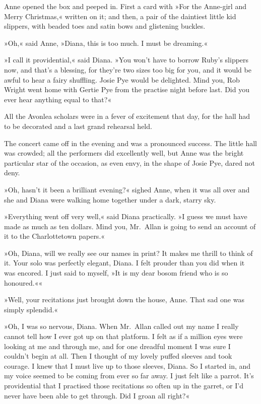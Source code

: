 Anne opened the box and peeped in. First a card with »For the Anne-girl and Merry Christmas,« written on it; and then, a pair of the daintiest little kid slippers, with beaded toes and satin bows and glistening buckles.

»Oh,« said Anne, »Diana, this is too much. I must be dreaming.«

»I call it providential,« said Diana. »You won't have to borrow Ruby's slippers now, and that's a blessing, for they're two sizes too big for you, and it would be awful to hear a fairy shuffling. Josie Pye would be delighted. Mind you, Rob Wright went home with Gertie Pye from the practise night before last. Did you ever hear anything equal to that?«

All the Avonlea scholars were in a fever of excitement that day, for the hall had to be decorated and a last grand rehearsal held.

The concert came off in the evening and was a pronounced success. The little hall was crowded; all the performers did excellently well, but Anne was the bright particular star of the occasion, as even envy, in the shape of Josie Pye, dared not deny.

»Oh, hasn't it been a brilliant evening?« sighed Anne, when it was all over and she and Diana were walking home together under a dark, starry sky.

»Everything went off very well,« said Diana practically. »I guess we must have made as much as ten dollars. Mind you, Mr.~Allan is going to send an account of it to the Charlottetown papers.«

»Oh, Diana, will we really see our names in print? It makes me thrill to think of it. Your solo was perfectly elegant, Diana. I felt prouder than you did when it was encored. I just said to myself, »It is my dear bosom friend who is so honoured.««

»Well, your recitations just brought down the house, Anne. That sad one was simply splendid.«

»Oh, I was so nervous, Diana. When Mr.~Allan called out my name I really cannot tell how I ever got up on that platform. I felt as if a million eyes were looking at me and through me, and for one dreadful moment I was sure I couldn't begin at all. Then I thought of my lovely puffed sleeves and took courage. I knew that I must live up to those sleeves, Diana. So I started in, and my voice seemed to be coming from ever so far away. I just felt like a parrot. It's providential that I practised those recitations so often up in the garret, or I'd never have been able to get through. Did I groan all right?«

